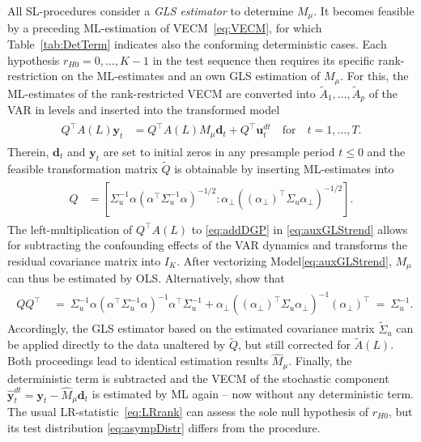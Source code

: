 All SL-procedures consider a \textit{GLS estimator} to determine $ M_\mu $. It becomes feasible by a preceding ML-estimation of VECM~\eqref{eq:VECM}, for which Table~\ref{tab:DetTerm} indicates also the conforming deterministic cases. Each hypothesis $ r_{H0} = 0,\ldots,K-1 $ in the test sequence then requires its specific rank-restriction on the ML-estimates and an own GLS estimation of $ M_\mu $. For this, the ML-estimates of the rank-restricted VECM are converted into $ \widetilde{A}_1, \ldots , \widetilde{A}_p $ of the VAR in levels and inserted into the transformed model
\begin{align} \label{eq:auxGLStrend}
\begin{split}
	{Q}^\top {A}(L) \boldsymbol{y}_t & = {Q}^\top {A}(L) M_\mu \boldsymbol{d}_t + {Q}^\top \boldsymbol{u}^{d \! t}_{t} \quad \text{for} \quad t=1,\ldots,T.
\end{split}
\end{align}
Therein, $ \boldsymbol{d}_t $ and $ \boldsymbol{y}_{t} $ are set to initial zeros in any presample period $ t \leq 0 $ and the feasible transformation matrix $ \widetilde{Q} $ is obtainable by inserting ML-estimates into
\begin{align} \label{eq:GLStrend}
\begin{split}
	Q & = \left[ \Sigma_u^{-1} \alpha \left( \alpha^\top \Sigma_u^{-1} \alpha \right)^{-1/2} : \alpha_\perp \left( \left( \alpha_\perp \right)^\top \Sigma_u \alpha_\perp \right)^{-1/2} \right].
\end{split}
\end{align}
The left-multiplication of $ {Q}^\top {A}(L) $ to \eqref{eq:addDGP} in \eqref{eq:auxGLStrend} allows for subtracting the confounding effects of the VAR dynamics and transforms the residual covariance matrix into $ I_K $. After vectorizing Model\eqref{eq:auxGLStrend}, $ M_\mu $ can thus be estimated by OLS. Alternatively, \citet[p. 438]{SaikkonenLutkepohl2000c} show that 
\begin{align} \label{eq:GLStrend2}
\begin{split}
	QQ^\top & \ = \ \Sigma_u^{-1} \alpha \left( \alpha^\top \Sigma_u^{-1} \alpha \right)^{-1} \alpha^\top \Sigma_u^{-1} + \alpha_\perp \left( \left( \alpha_\perp \right)^\top \Sigma_u \alpha_\perp \right)^{-1} \left( \alpha_\perp \right)^\top \ = \ \Sigma_u^{-1}.
\end{split}
\end{align} 
Accordingly, the GLS estimator based on the estimated covariance matrix $ \widetilde{\Sigma}_u $ can be applied directly to the data unaltered by $ \widetilde{Q} $, but still corrected for $ \widetilde{A}(L) $. Both proceedings lead to identical estimation results $ \widehat{M}_\mu $. Finally, the deterministic term is subtracted and the VECM of the stochastic component $ \boldsymbol{\hat{y}}^{d \! t}_{t} = \boldsymbol{y}_t - \widehat{M}_\mu \boldsymbol{d}_t $ is estimated by ML again -- now without any deterministic term. The usual LR-statistic~\eqref{eq:LRrank} can assess the sole null hypothesis of $ r_{H0} $, but its test distribution \eqref{eq:asympDistr} differs from the \citeauthor{Johansen1988} procedure.



